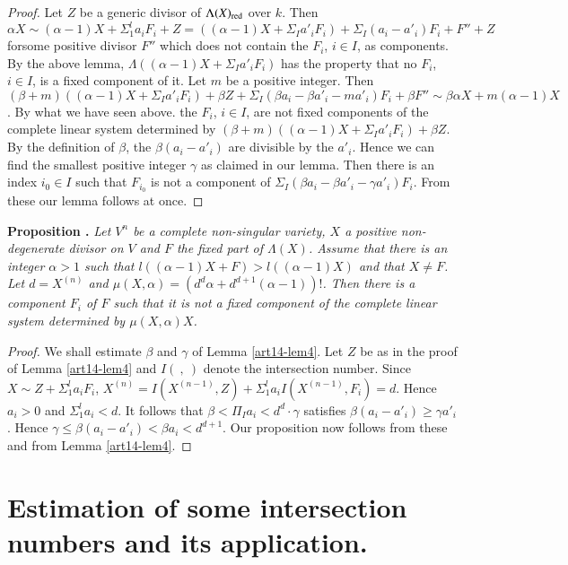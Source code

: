 \begin{proof}
Let $Z$ be a generic divisor of $\Lambda(X)_{\operatorname{\mathrm{red}}}$ over $k$. Then $\alpha X\sim (\alpha-1)X+\Sigma^{l}_{1}a_{i}F_{i}+Z=((\alpha-1)X+\Sigma_{I}a'_{i}F_{i})+\Sigma_{I}(a_{i}-a'_{i})F_{i}+F''+Z$ for\pageoriginale some positive divisor $F''$ which does not contain the $F_{i}$, $i\in I$, as components. By the above lemma, $\Lambda((\alpha-1)X+\Sigma_{I}a'_{i}F_{i})$ has the property that no $F_{i}$, $i\in I$, is a fixed component of it. Let $m$ be a positive integer. Then $(\beta+m)((\alpha-1)X+\Sigma_{I}a'_{i}F_{i})+\beta Z+\Sigma_{I}(\beta a_{i}-\beta a'_{i}-ma'_{i})F_{i}+\beta F''\sim \beta\alpha X+m(\alpha-1)X$. By what we have seen above. the $F_{i}$, $i\in I$, are not fixed components of the complete linear system determined by $(\beta+m)((\alpha-1)X+\Sigma_{I}a'_{i}F_{i})+\beta Z$. By the definition of $\beta$, the $\beta(a_{i}-a'_{i})$ are divisible by the $a'_{i}$. Hence we can find the smallest positive integer $\gamma$ as claimed in our lemma. Then there is an index $i_{0}\in I$ such that $F_{i_{0}}$ is not a component of $\Sigma_{I}(\beta a_{i}-\beta a'_{i}-\gamma a'_{i})F_{i}$. From these our lemma follows at once.
\end{proof}

\medskip
\noindent
{\bf Proposition .\label{art14-prop4}}
{\em Let $V^{n}$ be a complete non-singular variety, $X$ a positive non-degenerate divisor on $V$ and $F$ the fixed part of $\Lambda(X)$. Assume that there is an integer $\alpha >1$ such that $l((\alpha-1)X+F)>l((\alpha-1)X)$ and that $X\neq F$. Let $d=X^{(n)}$ and $\mu(X,\alpha)=(d^{d}\alpha+d^{d+1}(\alpha-1))!$. Then there is a component $F_{i}$ of $F$ such that it is not a fixed component of the complete linear system determined by $\mu(X,\alpha)X$.}

\begin{proof}
We shall estimate $\beta$ and $\gamma$ of Lemma \ref{art14-lem4}. Let $Z$ be as in the proof of Lemma \ref{art14-lem4} and $I(~ ,~ )$ denote the intersection number. Since $X\sim Z+\Sigma^{l}_{1}a_{i}F_{i}$, $X^{(n)}=I(X^{(n-1)},Z)+\Sigma^{l}_{1}a_{i}I(X^{(n-1)},F_{i})=d$. Hence $a_{i}>0$ and $\Sigma^{l}_{1}a_{i}<d$. It follows that $\beta<\Pi_{I}a_{i}<d^{d}\cdot \gamma$ satisfies $\beta(a_{i}-a'_{i})\geq \gamma a'_{i}$. Hence $\gamma\leq \beta(a_{i}-a'_{i})<\beta a_{i}<d^{d+1}$. Our proposition now follows from these and from Lemma \ref{art14-lem4}.
\end{proof}

\section{Estimation of some intersection numbers and its application.}\label{art14-sec4}

